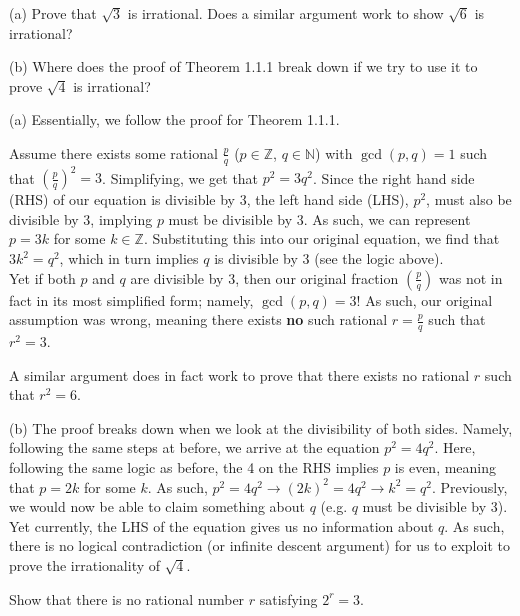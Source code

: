 \documentclass[../analysis_sols.tex]{subfiles}
\begin{document}
\begin{exercise}
    \indent
    (a) Prove that \( \sqrt{3} \) is irrational. Does a similar argument work to show \( \sqrt{6} \) is irrational?

    (b) Where does the proof of Theorem 1.1.1 break down if we try to use it to prove \( \sqrt{4} \) is irrational?
\end{exercise}


\begin{solution}
    (a) Essentially, we follow the proof for Theorem 1.1.1. 

    Assume there exists some rational \( \frac{p}{q} \) ($p \in \mathbb{Z}$, $q \in \mathbb{N}$) with $\gcd(p, q) = 1$ such that $\left(\frac{p}{q}\right)^2 = 3$. Simplifying, we get that $p^2 = 3q^2$. Since the right hand side (RHS) of our equation is divisible by 3, the left hand side (LHS), $p^2$, must also be divisible by 3, implying $p$ must be divisible by 3. As such, we can represent $p = 3k$ for some $k \in \mathbb{Z}$. Substituting this into our original equation, we find that $3k^2 = q^2$, which in turn implies $q$ is divisible by 3 (see the logic above). \\
    Yet if both $p$ and $q$ are divisible by 3, then our original fraction $\left(\frac{p}{q}\right)$ was not in fact in its most simplified form; namely, $\gcd(p, q) = 3$! As such, our original assumption was wrong, meaning there exists \textbf{no} such rational $r = \frac{p}{q}$ such that $r^2 = 3$.
    
    A similar argument does in fact work to prove that there exists no rational $r$ such that $r^2 = 6$.

    (b) The proof breaks down when we look at the divisibility of both sides. Namely, following the same steps at before, we arrive at the equation $p^2 = 4q^2$. Here, following the same logic as before, the 4 on the RHS implies $p$ is even, meaning that $p = 2k$ for some $k$. As such, $p^2 = 4q^2 \rightarrow (2k)^2 = 4q^2 \rightarrow k^2 = q^2$. Previously, we would now be able to claim something about $q$ (e.g. $q$ must be divisible by 3). Yet currently, the LHS of the equation gives us no information about $q$. As such, there is no logical contradiction (or infinite descent argument) for us to exploit to prove the irrationality of $\sqrt{4}$.

\end{solution}


\begin{exercise}
    Show that there is no rational number \( r \) satisfying \( 2^{r} = 3 \).
\end{exercise}
\end{document}
